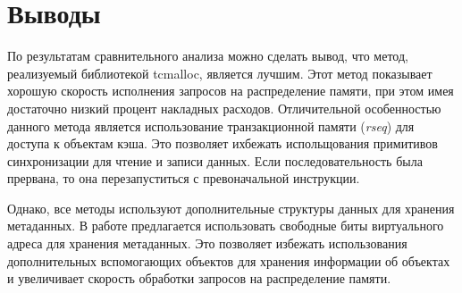 \pagebreak
\section{Выводы}
По результатам сравнительного анализа можно сделать вывод, что метод, реализуемый библиотекой tcmalloc, является лучшим. Этот метод показывает хорошую скорость исполнения запросов на распределение памяти, при этом имея достаточно низкий процент накладных расходов. Отличительной особенностью данного метода является использование транзакционной памяти (\textit{rseq}) для доступа к объектам кэша. Это позволяет ихбежать испольщования примитивов синхронизации для чтение и записи данных. Если последовательность была прервана, то она перезапуститься с превоначальной инструкции.

Однако, все методы используют дополнительные структуры данных для хранения метаданных. В работе предлагается использовать свободные биты виртуального адреса для хранения метаданных. Это позволяет избежать использования дополнительных вспомогающих объектов для хранения информации об объектах и увеличивает скорость обработки запросов на распределение памяти.